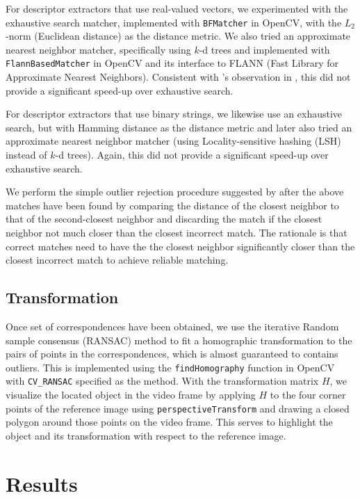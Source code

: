 \documentclass[11pt]{article} %
\theoremstyle{plain}
\theoremstyle{definition}
\theoremstyle{remark}
\numberwithin{equation}{section} %
\numberwithin{figure}{section} %
\numberwithin{table}{section} %
\begin{document}
For descriptor extractors that use real-valued vectors, we experimented with the exhaustive 
search matcher, implemented with \texttt{BFMatcher} in OpenCV, with the $L_2$-norm (Euclidean 
distance) as the distance metric. We also tried an approximate nearest neighbor matcher, 
specifically using $k$-d trees and implemented with \texttt{FlannBasedMatcher} in OpenCV 
and its interface to FLANN (Fast Library for Approximate Nearest Neighbors). Consistent with 
\citeauthor{Lowe2004}'s observation in \citep{Lowe2004}, this did not provide a significant 
speed-up over exhaustive search. 

For descriptor extractors that use binary strings, we likewise use an exhaustive search, but
with Hamming distance as the distance metric and later also tried an approximate nearest neighbor 
matcher (using Locality-sensitive hashing (LSH) instead of $k$-d trees). Again, this did not 
provide a significant speed-up over exhaustive search. 

We perform the simple outlier rejection procedure suggested by \citeauthor{Lowe2004} after 
the above matches have been found by comparing the distance of the closest neighbor 
to that of the second-closest neighbor and discarding the match if the closest neighbor
not much closer than the closest incorrect match. The rationale is that correct matches need 
to have the the closest neighbor significantly closer than the closest incorrect match to 
achieve reliable matching.

\subsection{Transformation}

Once set of correspondences have been obtained, we use the iterative Random sample consensus 
(RANSAC) method to fit a homographic transformation to the pairs of points in the correspondences,
which is almost guaranteed to contains outliers. This is implemented using the \texttt{findHomography} 
function in OpenCV with \texttt{CV\_RANSAC} specified as the method. With the transformation 
matrix $H$, we visualize the located object in the video frame by applying $H$ to the four corner 
points of the reference image using \texttt{perspectiveTransform} and drawing a closed polygon 
around those points on the video frame. This serves to highlight the object and its transformation 
with respect to the reference image.

\section{Results} \label{sec:results}



\end{document}
